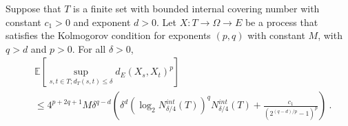 \begin{theorem}\label{thm:finite_set_bound_of_dist_le}
  \leanok
Suppose that $T$ is a finite set with bounded internal covering number with constant $c_1>0$ and exponent $d > 0$.
Let $X : T \to \Omega \to E$ be a process that satisfies the Kolmogorov condition for exponents $(p,q)$ with constant $M$, with $q > d$ and $p > 0$.
For all $\delta > 0$,
\begin{align*}
  &\mathbb{E}\left[ \sup_{s, t \in T; d_T(s, t) \le \delta} d_E(X_s, X_t)^p \right]
  \\
  &\le 4^{p+2q+1} M \delta^{q-d} \left(\delta^d \left(\log_2 N^{int}_{\delta/4}(T) \right)^q  N^{int}_{\delta/4}(T)
    + \frac{c_1}{\left( 2^{(q -d)/p} - 1\right)^p}\right)
  \: .
\end{align*}
\end{theorem}

